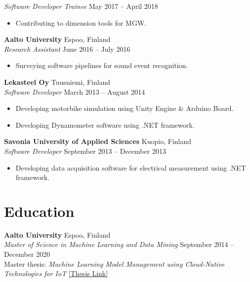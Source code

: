 \documentclass[10pt,a4paper]{article}
\begin{document}
\vspace{2pt}
\textit{Software Developer Trainee} \hfill May 2017 -- April 2018
\begin{itemize}
    \item Contributing to dimension tools for MGW.
\end{itemize}

\vspace{4pt}
\textbf{Aalto University} \hfill Espoo, Finland \\
\textit{Research Assistant} \hfill June 2016 -- July 2016
\begin{itemize}
    \item Surveying software pipelines for sound event recognition.
\end{itemize}

\vspace{4pt}
\textbf{Lekasteel Oy} \hfill Tuusniemi, Finland \\
\textit{Software Developer} \hfill March 2013 -- August 2014
\begin{itemize}
    \item Developing motorbike simulation using Unity Engine \& Arduino Board.
    \item Developing Dynamometer software using .NET framework.
\end{itemize}

\vspace{4pt}
\textbf{Savonia University of Applied Sciences} \hfill Kuopio, Finland \\
\textit{Software Developer} \hfill September 2013 -- December 2013
\begin{itemize}
    \item Developing data acquisition software for electrical measurement using .NET framework.
\end{itemize}

\section*{Education}
\small

\textbf{Aalto University} \hfill Espoo, Finland \\
\textit{Master of Science in Machine Learning and Data Mining} \hfill September 2014 -- December 2020 \\
Master thesis: \textit{Machine Learning Model Management using Cloud-Native Technologies for IoT} \hfill \href{https://aaltodoc.aalto.fi/handle/123456789/102472}{[Thesis Link]}
\end{document}
